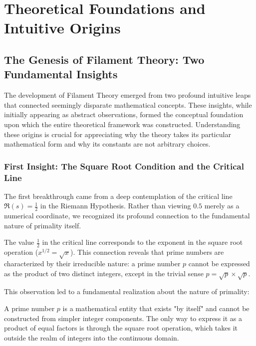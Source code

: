 
\section{Theoretical Foundations and Intuitive Origins}

\subsection{The Genesis of Filament Theory: Two Fundamental Insights}

The development of Filament Theory emerged from two profound intuitive leaps that connected seemingly disparate mathematical concepts. These insights, while initially appearing as abstract observations, formed the conceptual foundation upon which the entire theoretical framework was constructed. Understanding these origins is crucial for appreciating why the theory takes its particular mathematical form and why its constants are not arbitrary choices.

\subsubsection{First Insight: The Square Root Condition and the Critical Line}

The first breakthrough came from a deep contemplation of the critical line $\Re(s) = \frac{1}{2}$ in the Riemann Hypothesis. Rather than viewing $0.5$ merely as a numerical coordinate, we recognized its profound connection to the fundamental nature of primality itself.

\begin{insight}
The value $\frac{1}{2}$ in the critical line corresponds to the exponent in the square root operation ($x^{1/2} = \sqrt{x}$). This connection reveals that prime numbers are characterized by their irreducible nature: a prime number $p$ cannot be expressed as the product of two distinct integers, except in the trivial sense $p = \sqrt{p} \times \sqrt{p}$.
\end{insight}

This observation led to a fundamental realization about the nature of primality:

\begin{definition}
A prime number $p$ is a mathematical entity that exists "by itself" and cannot be constructed from simpler integer components. The only way to express it as a product of equal factors is through the square root operation, which takes it outside the realm of integers into the continuous domain.
\end{definition}

